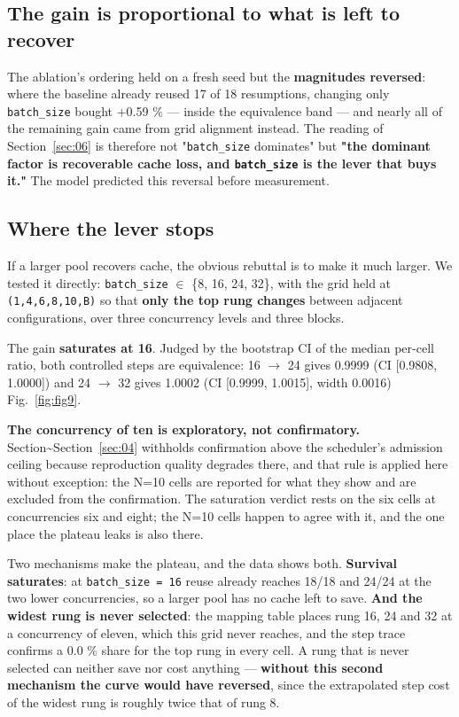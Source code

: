 \subsection{The gain is proportional to what is left to recover}

The ablation's ordering held on a fresh seed but the \textbf{magnitudes reversed}: where the baseline already reused 17 of 18 resumptions, changing only \texttt{batch\_size} bought +0.59 \% --- inside the equivalence band --- and nearly all of the remaining gain came from grid alignment instead. The reading of Section~\ref{sec:06} is therefore not "\texttt{batch\_size} dominates" but \textbf{"the dominant factor is recoverable cache loss, and \texttt{batch\_size} is the lever that buys it."} The model predicted this reversal before measurement.

\subsection{Where the lever stops}

If a larger pool recovers cache, the obvious rebuttal is to make it much larger. We tested it directly: \texttt{batch\_size} $\in$ \{8, 16, 24, 32\}, with the grid held at \texttt{(1,4,6,8,10,B)} so that \textbf{only the top rung changes} between adjacent configurations, over three concurrency levels and three blocks.

The gain \textbf{saturates at 16}. Judged by the bootstrap CI of the median per-cell ratio, both controlled steps are equivalence: 16 $\rightarrow$ 24 gives 0.9999 (CI [0.9808, 1.0000]) and 24 $\rightarrow$ 32 gives 1.0002 (CI [0.9999, 1.0015], width 0.0016) Fig.~\ref{fig:fig9}.

\textbf{The concurrency of ten is exploratory, not confirmatory.} Section\textasciitilde{}Section~\ref{sec:04} withholds confirmation above the scheduler's admission ceiling because reproduction quality degrades there, and that rule is applied here without exception: the N=10 cells are reported for what they show and are excluded from the confirmation. The saturation verdict rests on the six cells at concurrencies six and eight; the N=10 cells happen to agree with it, and the one place the plateau leaks is also there.

Two mechanisms make the plateau, and the data shows both. \textbf{Survival saturates}: at \texttt{batch\_size = 16} reuse already reaches 18/18 and 24/24 at the two lower concurrencies, so a larger pool has no cache left to save. \textbf{And the widest rung is never selected}: the mapping table places rung 16, 24 and 32 at a concurrency of eleven, which this grid never reaches, and the step trace confirms a 0.0 \% share for the top rung in every cell. A rung that is never selected can neither save nor cost anything --- \textbf{without this second mechanism the curve would have reversed}, since the extrapolated step cost of the widest rung is roughly twice that of rung 8.

